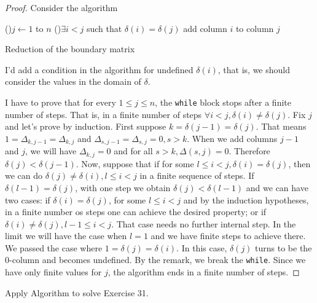 \begin{proof}

Consider the algorithm

\begin{algorithm}[H]
    \SetAlgoLined
     \For(){$j \leftarrow 1$ to $n$}{
        \While(){$\exists i < j$ such that $\delta(i) = \delta(j)$}{
            add column $i$ to column $j$
        }
     }
     \caption{Reduction of the boundary matrix}
    \end{algorithm}

\begin{remark}
    I'd add a condition in the algorithm for undefined $\delta(i)$, that is,
    we should consider the values in the domain of $\delta$.
\end{remark}

I have to prove that for every $1 \le j \le n$, the \texttt{while} block stops
after a finite number of steps. That is, in a finite number of steps $\forall
i < j, \delta(i) \neq \delta(j)$. Fix $j$ and let's prove by induction. First
suppose $k = \delta(j-1) = \delta(j)$. That means $1 = \Delta_{k,j-1} =
\Delta_{k,j}$ and $\Delta_{s,j-1} = \Delta_{s,j}=0, s > k$. When we add
columns $j-1$ and $j$, we will have $\Delta_{k,j} = 0$ and for all $s > k,
\Delta(s, j) = 0$. Therefore $\delta(j) < \delta(j-1)$. Now, suppose that if for
some $l \le i < j, \delta(i) = \delta(j)$,  then we can
do $\delta(j) \neq \delta(i), l \le i < j$ in a finite sequence of steps. If $\delta(l-1) = \delta(j)$, with one step we obtain $\delta(j) <
\delta(l-1)$ and we can have two cases: if $\delta(i) = \delta(j)$, for some
$l \le i < j$ and by the
induction hypotheses, in a finite number os steps one can achieve the desired
property; or if $\delta(i) \neq \delta(j), l-1 \le i < j$. That case needs no
further internal step. In the limit we will have the case when $l=1$ and we
have finite steps to achieve there. We passed the case where $1 = \delta(j) =
\delta(i)$. In this case, $\delta(j)$ turns to be the 0-column and becomes
undefined. By the remark, we break the \texttt{while}. Since we have only
finite values for $j$, the algorithm ends in a finite number of steps. 

\end{proof}

\noindent\linia 

\begin{exercise}
    Apply Algorithm to solve Exercise 31.
\end{exercise}

